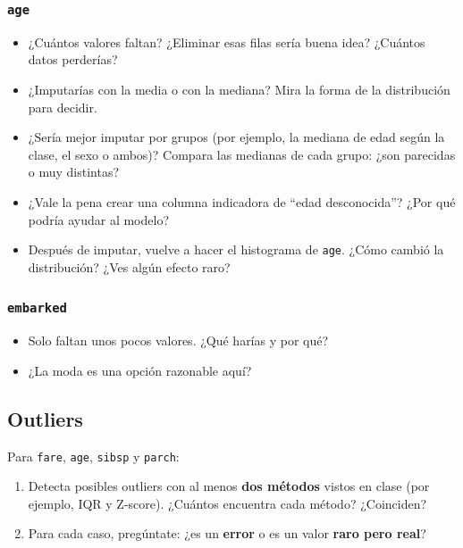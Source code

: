 \documentclass[11pt,a4paper]{article}
\newcommand{\col}[1]{\texttt{#1}}
\begin{document}
\subsubsection*{\col{age}}
\begin{itemize}
  \item ¿Cuántos valores faltan? ¿Eliminar esas filas sería buena idea? ¿Cuántos datos perderías?
  \item ¿Imputarías con la media o con la mediana? Mira la forma de la distribución para decidir.
  \item ¿Sería mejor imputar por grupos (por ejemplo, la mediana de edad según la clase,
        el sexo o ambos)? Compara las medianas de cada grupo: ¿son parecidas o muy distintas?
  \item ¿Vale la pena crear una columna indicadora de ``edad desconocida''? ¿Por qué
        podría ayudar al modelo?
  \item Después de imputar, vuelve a hacer el histograma de \col{age}. ¿Cómo cambió la
        distribución? ¿Ves algún efecto raro?
\end{itemize}

\subsubsection*{\col{embarked}}
\begin{itemize}
  \item Solo faltan unos pocos valores. ¿Qué harías y por qué?
  \item ¿La moda es una opción razonable aquí?
\end{itemize}

\subsection{Outliers}

Para \col{fare}, \col{age}, \col{sibsp} y \col{parch}:
\begin{enumerate}
  \item Detecta posibles outliers con al menos \textbf{dos métodos} vistos en clase (por
        ejemplo, IQR y Z-score). ¿Cuántos encuentra cada método? ¿Coinciden?
  \item Para cada caso, pregúntate: ¿es un \textbf{error} o es un valor \textbf{raro pero real}?
\end{enumerate}
\end{document}
